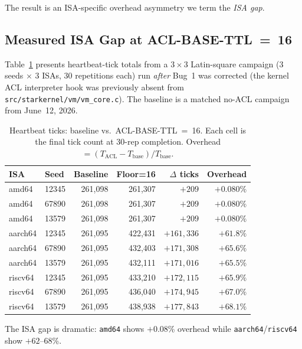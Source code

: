 \documentclass[11pt,letterpaper,openany]{article}
\begin{document}
The result is an ISA-specific overhead asymmetry we term the
\emph{ISA gap}.

\subsection{Measured ISA Gap at ACL-BASE-TTL~=~16}

Table~\ref{tab:isagap} presents heartbeat-tick totals from a
$3\times3$ Latin-square campaign (3 seeds $\times$ 3 ISAs, 30
repetitions each) run \emph{after} Bug~1 was corrected (the kernel
ACL interpreter hook was previously absent from
\texttt{src/starkernel/vm/vm\_core.c}).  The baseline is a matched
no-ACL campaign from June~12, 2026.

\begin{table}[H]
\centering
\caption{Heartbeat ticks: baseline vs.\ ACL-BASE-TTL~=~16.
  Each cell is the final tick count at 30-rep completion.
  Overhead $= (T_{\text{ACL}} - T_{\text{base}}) / T_{\text{base}}$.}
\label{tab:isagap}
\begin{tabular}{llrrrr}
\toprule
\textbf{ISA} & \textbf{Seed} & \textbf{Baseline} & \textbf{Floor=16} & \textbf{$\Delta$ ticks} & \textbf{Overhead} \\
\midrule
amd64   & 12345 & 261,098 & 261,307 & $+209$     & $+0.080\%$ \\
amd64   & 67890 & 261,098 & 261,307 & $+209$     & $+0.080\%$ \\
amd64   & 13579 & 261,098 & 261,307 & $+209$     & $+0.080\%$ \\
\midrule
aarch64 & 12345 & 261,095 & 422,431 & $+161,336$ & $+61.8\%$  \\
aarch64 & 67890 & 261,095 & 432,403 & $+171,308$ & $+65.6\%$  \\
aarch64 & 13579 & 261,095 & 432,111 & $+171,016$ & $+65.5\%$  \\
\midrule
riscv64 & 12345 & 261,095 & 433,210 & $+172,115$ & $+65.9\%$  \\
riscv64 & 67890 & 261,095 & 436,040 & $+174,945$ & $+67.0\%$  \\
riscv64 & 13579 & 261,095 & 438,938 & $+177,843$ & $+68.1\%$  \\
\bottomrule
\end{tabular}
\end{table}

The ISA gap is dramatic: \texttt{amd64} shows $+0.08$\% overhead while
\texttt{aarch64}/\texttt{riscv64} show $+62$--$68$\%.

\end{document}
